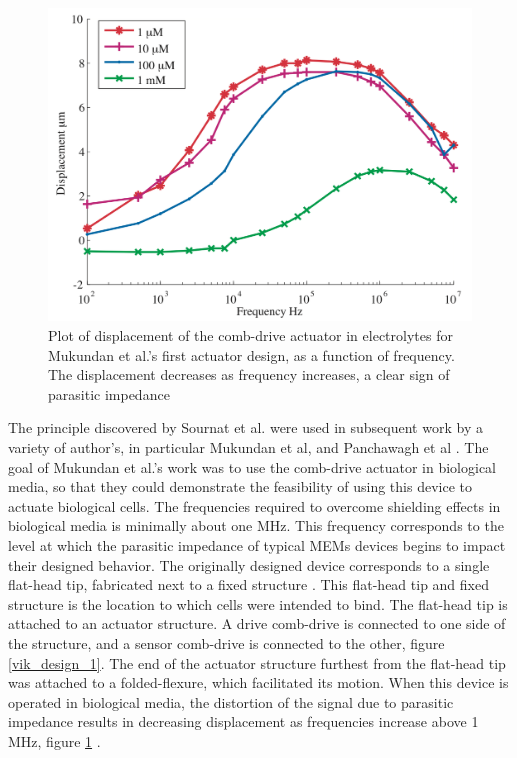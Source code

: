 \begin{figure}[htpb]
    \begin{center}
    \includegraphics[width=0.6\linewidth]{Chapter2/Figs/Raster/displacementAttenuationDesgn1.png}
    \caption{Plot of displacement of the comb-drive actuator in electrolytes for Mukundan et al.'s first actuator design, as a function of frequency. The displacement decreases as frequency increases, a clear sign of parasitic impedance} \label{disp_attenuation}
    \end{center}
\end{figure}
The principle discovered by Sournat et al. were used in subsequent work by a variety of author's, in particular Mukundan et al, and Panchawagh et al \cite{Mukundan2009,MukundanandPonce2009,Panchawagh2009}. The goal of Mukundan et al.'s work was to use the comb-drive actuator in biological media, so that they could demonstrate the feasibility of using this device to actuate biological cells. The frequencies required to overcome shielding effects in biological media is minimally about one MHz. This frequency corresponds to the level at which the parasitic impedance of typical MEMs devices begins to impact their designed behavior. The originally designed device corresponds to a single flat-head tip, fabricated next to a fixed structure \cite{Mukundan2009}. This flat-head tip and fixed structure is the location to which cells were intended to bind. The flat-head tip is attached to an actuator structure. A drive comb-drive is connected to one side of the structure, and a sensor comb-drive is connected to the other, figure \ref{vik_design_1}. The end of the actuator structure furthest from the flat-head tip was attached to a folded-flexure, which facilitated its motion. When this device is operated in biological media, the distortion of the signal due to parasitic impedance results in decreasing displacement as frequencies increase above 1 MHz, figure \ref{disp_attenuation} \cite{Mukundan2009}. 

